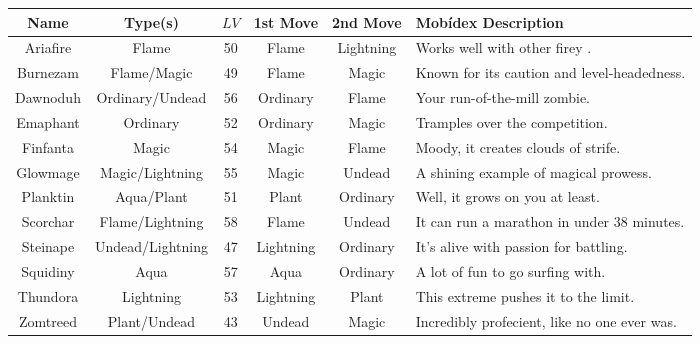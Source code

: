 \begin{center}
\begin{tabular}{|c|c|c|c|c|p{2in}|}\hline
  Name & Type(s) & \(LV\) & 1st Move & 2nd Move & Mob\'idex Description \\\hline\hline
  Ariafire & Flame & 50 & Flame & Lightning &
    Works well with other firey \mappMobimon{}. \\\hline
  Burnezam & Flame/Magic & 49 & Flame & Magic &
    Known for its caution and level-headedness. \\\hline
  Dawnoduh & Ordinary/Undead & 56 & Ordinary & Flame &
    Your run-of-the-mill zombie. \\\hline
  Emaphant & Ordinary & 52 & Ordinary & Magic &
    Tramples over the competition. \\\hline
  Finfanta & Magic & 54 & Magic & Flame &
    Moody, it creates clouds of strife. \\\hline
  Glowmage & Magic/Lightning & 55 & Magic & Undead &
    A shining example of magical prowess. \\\hline
  Planktin & Aqua/Plant & 51 & Plant & Ordinary &
    Well, it grows on you at least. \\\hline
  Scorchar & Flame/Lightning & 58 & Flame & Undead &
    It can run a marathon in under 38 minutes. \\\hline
  Steinape & Undead/Lightning & 47 & Lightning & Ordinary &
    It's alive with passion for battling. \\\hline
  Squidiny & Aqua & 57 & Aqua & Ordinary &
    A lot of fun to go surfing with. \\\hline
  Thundora & Lightning & 53 & Lightning & Plant &
    This extreme \mappMobimon{} pushes it to the limit. \\\hline
  Zomtreed & Plant/Undead & 43 & Undead & Magic &
    Incredibly profecient, like no one ever was. \\\hline
\end{tabular}
\end{center}


